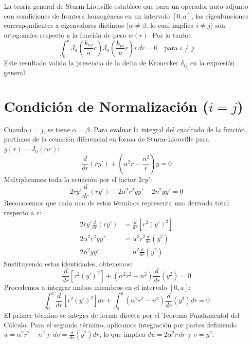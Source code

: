 \documentclass[11pt,a4paper]{article}
\begin{document}
La teoría general de Sturm-Liouville establece que para un operador auto-adjunto con condiciones de frontera homogéneas en un intervalo $[0, a]$, las eigenfunciones correspondientes a eigenvalores distintos ($\alpha \neq \beta$, lo cual implica $i \neq j$) son ortogonales respecto a la función de peso $w(r)$. Por lo tanto:
\begin{equation}
	\int_0^a J_n\left(\frac{k_{nj}}{a}r\right) J_n\left(\frac{k_{ni}}{a}r\right) r \, dr = 0 \quad \text{para } i \neq j
\end{equation}
Este resultado valida la presencia de la delta de Kronecker $\delta_{ij}$ en la expresión general.

\section{Condición de Normalización ($i = j$)}
Cuando $i = j$, se tiene $\alpha = \beta$. Para evaluar la integral del cuadrado de la función, partimos de la ecuación diferencial en forma de Sturm-Liouville para $y(r) = J_n(\alpha r)$:
\begin{equation}
	\frac{d}{dr}(r y') + \left(\alpha^2 r - \frac{n^2}{r}\right) y = 0
\end{equation}
Multiplicamos toda la ecuación por el factor $2r y'$:
\begin{equation}
	2r y' \frac{d}{dr}(r y') + 2\alpha^2 r^2 y y' - 2n^2 y y' = 0
\end{equation}
Reconocemos que cada uno de estos términos representa una derivada total respecto a $r$:
\begin{align}
	2r y' \frac{d}{dr}(r y') & = \frac{d}{dr} \left[ r^2 (y')^2 \right] \\
	2\alpha^2 r^2 y y'       & = \alpha^2 r^2 \frac{d}{dr} (y^2)        \\
	2n^2 y y'                & = n^2 \frac{d}{dr} (y^2)
\end{align}
Sustituyendo estas identidades, obtenemos:
\begin{equation}
	\frac{d}{dr} \left[ r^2 (y')^2 \right] + (\alpha^2 r^2 - n^2) \frac{d}{dr} (y^2) = 0
\end{equation}
Procedemos a integrar ambos miembros en el intervalo $[0, a]$:
\begin{equation}
	\int_0^a \frac{d}{dr} \left[ r^2 (y')^2 \right] dr + \int_0^a (\alpha^2 r^2 - n^2) \frac{d}{dr} (y^2) dr = 0
\end{equation}
El primer término se integra de forma directa por el Teorema Fundamental del Cálculo. Para el segundo término, aplicamos integración por partes definiendo $u = \alpha^2 r^2 - n^2$ y $dv = \frac{d}{dr}(y^2) dr$, lo que implica $du = 2\alpha^2 r \, dr$ y $v = y^2$:
\end{document}
